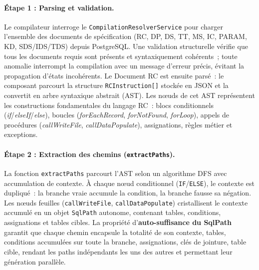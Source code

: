 

\paragraph{Étape 1 : Parsing et validation.}
Le compilateur interroge le \texttt{CompilationResolverService} pour charger l'ensemble des documents de spécification (RC, DP, DS, TT, MS, IC, PARAM, KD, SDS/IDS/TDS) depuis PostgreSQL. Une validation structurelle vérifie que tous les documents requis sont présents et syntaxiquement cohérents~; toute anomalie interrompt la compilation avec un message d'erreur précis, évitant la propagation d'états incohérents. Le Document RC est ensuite parsé~: le composant parcourt la structure \texttt{RCInstruction[]} stockée en JSON et la convertit en arbre syntaxique abstrait (AST). Les nœuds de cet AST représentent les constructions fondamentales du langage RC~: blocs conditionnels (\textit{if}/\textit{elseIf}/\textit{else}), boucles (\textit{forEachRecord}, \textit{forNotFound}, \textit{forLoop}), appels de procédures (\textit{callWriteFile}, \textit{callDataPopulate}), assignations, règles métier et exceptions.

\paragraph{Étape 2 : Extraction des chemins (\texttt{extractPaths}).}
La fonction \texttt{extractPaths} parcourt l'AST selon un algorithme DFS avec accumulation de contexte. À chaque nœud conditionnel (\texttt{IF}/\texttt{ELSE}), le contexte est dupliqué~: la branche vraie accumule la condition, la branche fausse sa négation. Les nœuds feuilles (\texttt{callWriteFile}, \texttt{callDataPopulate}) cristallisent le contexte accumulé en un objet \texttt{SqlPath} autonome, contenant tables, conditions, assignations et tables cibles. La propriété d'\textbf{auto-suffisance du SqlPath} garantit que chaque chemin encapsule la totalité de son contexte, tables, conditions accumulées sur toute la branche, assignations, clés de jointure, table cible, rendant les paths indépendants les uns des autres et permettant leur génération parallèle.

